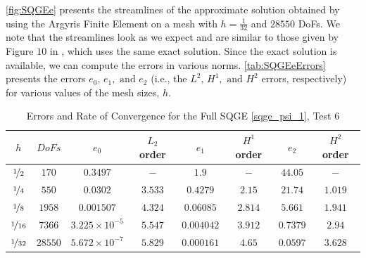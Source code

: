 \autoref{fig:SQGEe} presents the streamlines of the approximate solution obtained by using the
Argyris Finite Element on a mesh with $h=\frac{1}{32}$ and $28550$ DoFs. We note that the
streamlines look as we expect and are similar to those given by Figure $10$ in \cite{Myers}, which
uses the same exact solution. Since the exact solution is available, we can compute the errors in
various norms. \autoref{tab:SQGEeErrors} presents the errors $e_0,\, e_1, \text{ and } e_2$ (i.e.,
the $L^2,\, H^1, \text{ and } H^2$ errors, respectively) for various values of the mesh sizes, $h$.

\begin{table}[H]
\begin{center}
\begin{tabular}{|c|c|c|c|c|c|c|c|}%
  \hline
  $h$ & $DoFs$ & $e_0$ & $L_2$ order & $e_1$ & $H^1$ order & $e_2$ & $H^2$ order \\[0.2em] %
  \hline
  $\nicefrac{1}{2}$ & $170$ & $0.3497$ & $-$ & $1.9$ & $-$ & $44.05$ & $-$ \\[0.2em] %
  $\nicefrac{1}{4}$ & $550$ & $0.0302$ & $3.533$ & $0.4279$ & $2.15$ & $21.74$ & $1.019$ \\[0.2em] %
  $\nicefrac{1}{8}$ & $1958$ & $0.001507$ & $4.324$ & $0.06085$ & $2.814$ & $5.661$ & $1.941$ \\[0.2em] %
  $\nicefrac{1}{16}$ & $7366$ & $3.225\times 10^{-5}$ & $5.547$ & $0.004042$ & $3.912$ & $0.7379$ & $2.94$ \\[0.2em] %
  $\nicefrac{1}{32}$ & $28550$ & $5.672\times 10^{-7}$ & $5.829$ & $0.000161$ & $4.65$ & $0.0597$ & $3.628$ \\[0.2em] %
 \hline
\end{tabular}
\end{center}
\caption{Errors and Rate of Convergence for the Full SQGE \eqref{sqge_psi_1}, Test 6}
\label{tab:SQGEeErrors}
\end{table}

